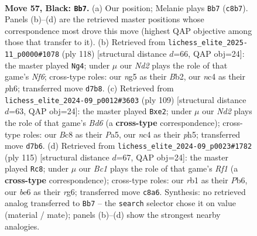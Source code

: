 \documentclass[11pt]{article}
\begin{document}
\clearpage

\begin{figure}[p]\centering
\begin{subfigure}{0.46\textwidth}\centering
\resizebox{\linewidth}{!}{%
\newchessgame
\chessboard[
  setfen={2b5/P2n2k1/4B3/5pN1/1pN2P2/1Pn3P1/5K1P/1R6 b - - 0 57},
  showmover=false,
  pgfstyle=straightmove, color=movearrow, markmove={c8-b7}
]}
\caption{}
\end{subfigure}\hfill
\begin{subfigure}{0.46\textwidth}\centering
\resizebox{\linewidth}{!}{%
\newchessgame
\chessboard[
  setfen={8/1b1Nb3/p3pNkp/Pn4p1/4p3/6PP/1B3P2/5K2 w - - 27 60},
  showmover=false,
  pgfstyle=straightmove, color=movearrow, markmove={f6-g4}
]}
\caption{}
\end{subfigure}
\\[4pt]
\begin{subfigure}{0.46\textwidth}\centering
\resizebox{\linewidth}{!}{%
\newchessgame
\chessboard[
  setfen={8/4k3/3n3p/p1KP3P/P4P2/1pNb4/1P2B3/8 b - - 4 55},
  showmover=false,
  pgfstyle=straightmove, color=movearrow, markmove={d3-e2}
]}
\caption{}
\end{subfigure}\hfill
\begin{subfigure}{0.46\textwidth}\centering
\resizebox{\linewidth}{!}{%
\newchessgame
\chessboard[
  setfen={5r2/4k3/1p3nRP/1P2NP1P/p4K2/P7/1P6/8 b - - 2 58},
  showmover=false,
  pgfstyle=straightmove, color=movearrow, markmove={f8-c8}
]}
\caption{}
\end{subfigure}
\caption{\textbf{Move 57, Black: \texttt{Bb7}.} (a) Our position; Melanie plays \texttt{Bb7} (\texttt{c8b7}). Panels (b)--(d) are the retrieved master positions whose correspondence most drove this move (highest QAP objective among those that transfer to it). (b) Retrieved from \texttt{lichess\_elite\_2025-11\_p0000\#1078} (ply 118) [structural distance $d$=66, QAP obj=24]: the master played \texttt{Ng4}; under $\mu$ our \emph{Nd2} plays the role of that game's \emph{Nf6}; cross-type roles: our \emph{n}g5 as their \emph{B}b2, our \emph{n}c4 as their \emph{p}h6; transferred move \texttt{d7b8}. (c) Retrieved from \texttt{lichess\_elite\_2024-09\_p0012\#3603} (ply 109) [structural distance $d$=63, QAP obj=24]: the master played \texttt{Bxe2}; under $\mu$ our \emph{Nd2} plays the role of that game's \emph{Bd6} (a \textbf{cross-type} correspondence); cross-type roles: our \emph{B}c8 as their \emph{P}a5, our \emph{n}c4 as their \emph{p}h5; transferred move \texttt{d7b6}. (d) Retrieved from \texttt{lichess\_elite\_2024-09\_p0023\#1782} (ply 115) [structural distance $d$=67, QAP obj=24]: the master played \texttt{Rc8}; under $\mu$ our \emph{Bc1} plays the role of that game's \emph{Rf1} (a \textbf{cross-type} correspondence); cross-type roles: our \emph{r}b1 as their \emph{P}b6, our \emph{b}e6 as their \emph{r}g6; transferred move \texttt{c8a6}. Synthesis: no retrieved analog transferred to \texttt{Bb7} -- the \texttt{search} selector chose it on value (material / mate); panels (b)--(d) show the strongest nearby analogies.}
\label{fig:thought-m113}
\end{figure}
\end{document}
